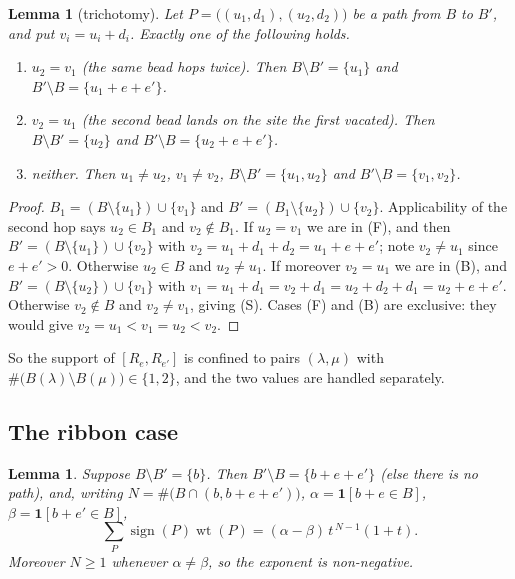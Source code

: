 \documentclass[11pt]{article}
\newtheorem{lemma}[theorem]{Lemma}
\theoremstyle{definition}
\newcommand{\one}{\mathbf{1}}
\begin{document}
\begin{lemma}[trichotomy]\label{lem:tri}
Let $P=\bigl((u_1,d_1),(u_2,d_2)\bigr)$ be a path from $B$ to $B'$, and put $v_i=u_i+d_i$. Exactly
one of the following holds.
\begin{enumerate}
\item[\rm(F)] $u_2=v_1$ (the same bead hops twice). Then $B\setminus B'=\{u_1\}$ and
$B'\setminus B=\{u_1+e+e'\}$.
\item[\rm(B)] $v_2=u_1$ (the second bead lands on the site the first vacated). Then
$B\setminus B'=\{u_2\}$ and $B'\setminus B=\{u_2+e+e'\}$.
\item[\rm(S)] neither. Then $u_1\ne u_2$, $v_1\ne v_2$, $B\setminus B'=\{u_1,u_2\}$ and
$B'\setminus B=\{v_1,v_2\}$.
\end{enumerate}
\end{lemma}

\begin{proof}
$B_1=(B\setminus\{u_1\})\cup\{v_1\}$ and $B'=(B_1\setminus\{u_2\})\cup\{v_2\}$. Applicability of
the second hop says $u_2\in B_1$ and $v_2\notin B_1$. If $u_2=v_1$ we are in (F), and then
$B'=(B\setminus\{u_1\})\cup\{v_2\}$ with $v_2=u_1+d_1+d_2=u_1+e+e'$; note $v_2\ne u_1$ since
$e+e'>0$. Otherwise $u_2\in B$ and $u_2\ne u_1$. If moreover $v_2=u_1$ we are in (B), and
$B'=(B\setminus\{u_2\})\cup\{v_1\}$ with $v_1=u_1+d_1=v_2+d_1=u_2+d_2+d_1=u_2+e+e'$. Otherwise
$v_2\notin B$ and $v_2\ne v_1$, giving (S). Cases (F) and (B) are exclusive: they would give
$v_2=u_1<v_1=u_2<v_2$.
\end{proof}

So the support of $[R_e,R_{e'}]$ is confined to pairs $(\lambda,\mu)$ with
$\#\bigl(B(\lambda)\setminus B(\mu)\bigr)\in\{1,2\}$, and the two values are handled separately.

\subsection*{The ribbon case}

\begin{lemma}\label{lem:type2}
Suppose $B\setminus B'=\{b\}$. Then $B'\setminus B=\{b+e+e'\}$ (else there is no path), and,
writing $N=\#\bigl(B\cap(b,b+e+e')\bigr)$, $\alpha=\one[b+e\in B]$, $\beta=\one[b+e'\in B]$,
\[
\sum_{P}\operatorname{sign}(P)\operatorname{wt}(P)=(\alpha-\beta)\,t^{\,N-1}(1+t).
\]
Moreover $N\ge1$ whenever $\alpha\ne\beta$, so the exponent is non-negative.
\end{lemma}
\end{document}
